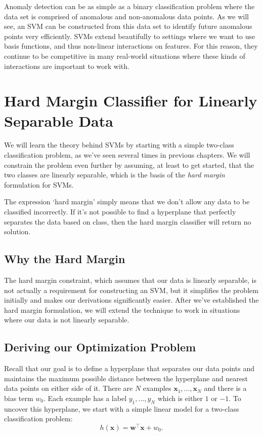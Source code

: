 Anomaly detection can be as simple as a binary classification problem where the data set is comprised of anomalous and non-anomalous data points. As we will see, an SVM can be constructed from this data set to identify future anomalous points very efficiently. SVMs extend beautifully to settings where we want to use basis functions, and thus non-linear interactions on features. For this reason, they continue to be competitive in many real-world situations where these kinds of interactions are important to work with.

\section{Hard Margin Classifier for Linearly Separable Data}

We will learn the theory behind SVMs by starting with a simple two-class classification problem, as we've seen several times in previous chapters. We will constrain the problem even further by assuming, at least to get started, that the two classes are linearly separable, which is the basis of the \textit{hard margin} formulation for SVMs.

\begin{warning}
    The expression `hard margin' simply means that we don't allow any data to be classified incorrectly. If it's not possible to find a hyperplane that perfectly separates the data based on class, then the hard margin classifier will return no solution.
\end{warning}

\subsection{Why the Hard Margin}
The hard margin constraint, which assumes that our data is linearly separable, is not actually a requirement for constructing an SVM, but it simplifies the problem initially and makes our derivations significantly easier. After we've established the hard margin formulation, we will extend the technique to work in situations where our data is not linearly separable.

\subsection{Deriving our Optimization Problem}
Recall that our goal is to define a hyperplane that separates our data points and maintains the maximum possible distance between the hyperplane and nearest data points on either side of it.
There are  $N$ examples  $\textbf{x}_{1}, ..., \textbf{x}_{N}$ and there is a bias term $w_{0}$.
Each example has a label $y_{1}, ..., y_{N}$ which is either $1$ or $-1$. 
To uncover this hyperplane, we start with a simple linear model for a two-class classification problem:
\begin{equation} \label{classification-fn}
h(\textbf{x}) = \textbf{w}^\top \textbf{x} + w_{0}.
\end{equation}

